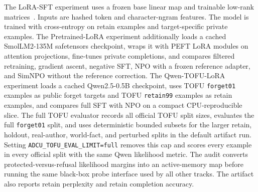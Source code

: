 \documentclass[10pt,journal,compsoc]{IEEEtran}
\begin{document}
The LoRA-SFT experiment uses a frozen base linear map and trainable low-rank matrices~\cite{hu2021lora}. Inputs are hashed token and character-ngram features. The model is trained with cross-entropy on retain examples and target-specific private examples. The Pretrained-LoRA experiment additionally loads a cached SmolLM2-135M safetensors checkpoint, wraps it with PEFT LoRA modules on attention projections, fine-tunes private completions, and compares filtered retraining, gradient ascent, negative SFT, NPO with a frozen reference adapter, and SimNPO without the reference correction. The Qwen-TOFU-LoRA experiment loads a cached Qwen2.5-0.5B checkpoint, uses TOFU \texttt{forget01} examples as public forget targets and TOFU \texttt{retain99} examples as retain examples, and compares full SFT with NPO on a compact CPU-reproducible slice. The full TOFU evaluator records all official TOFU split sizes, evaluates the full \texttt{forget01} split, and uses deterministic bounded subsets for the larger retain, holdout, real-author, world-fact, and perturbed splits in the default artifact run. Setting \texttt{ADCU\_TOFU\_EVAL\_LIMIT=full} removes this cap and scores every example in every official split with the same Qwen likelihood metric. The audit converts protected-versus-refusal likelihood margins into an active-memory map before running the same black-box probe interface used by all other tracks. The artifact also reports retain perplexity and retain completion accuracy.
\end{document}
